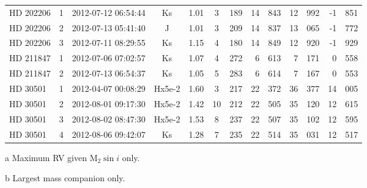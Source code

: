 \begin{table*}
\begin{threeparttable}[b]
\begin{tabular}{l c c c c c c r@{.}l r@{.}l r@{.}l}
            {HD 202206} & 1 & 2012-07-12 06:54:44 & Ks     		& 1.01 		& 3& 189 & 14      & 843 & 12 & 992\tnote{b}  & -1&851 \\ %
            {HD 202206} & 2 & 2012-07-13 05:41:40 & J       	  & 1.01 	  & 3 & 209 & 14      & 837 & 13 & 065\tnote{b}  & -1&772 \\ %
            {HD 202206} & 3 & 2012-07-11 08:29:55 & Ks     		& 1.15		& 4& 180 & 14      & 849 & 12 & 920\tnote{b}  & -1&929 \\ %
            {HD 211847} & 1 & 2012-07-06 07:02:57 & Ks     		& 1.07 		& 4& 272 & 6        & 613 & 7   & 171 & 0& 558\\ %
            {HD 211847} & 2 & 2012-07-13 06:54:37 & Ks     		& 1.05 		& 5& 283 & 6        & 614 & 7   & 167 & 0&553 \\ %
            {HD 30501}  & 1 & 2012-04-07 00:08:29 & Hx5e-2 	 & 1.60 	 & 3& 217 & 22      &  372 & 36 & 377 & 14&005 \\ %
            {HD 30501}  & 2 & 2012-08-01 09:17:30 & Hx5e-2    & 1.42     & 10& 212 & 22      & 505 & 35  & 120 & 12&615 \\ %
            {HD 30501}  & 3 & 2012-08-02 08:47:30 & Hx5e-2 	 & 1.53 	 & 8& 237 & 22      & 507 &  35 & 102 & 12&595 \\ %
            {HD 30501}  & 4 & 2012-08-06 09:42:07 & Ks     		 & 1.28 	 & 7& 235& 22      & 514 & 35 & 031 & 12&517 \\ %
            \bottomrule
        \end{tabular}\label{tab:observations}
        \begin{tablenotes}
          \item  [a]{Maximum RV given \(\textrm{M}_2\sin{i}\) only.}
          \item  [b]{Largest mass companion only.}
        \end{tablenotes}
    \end{threeparttable}
\end{table*}
